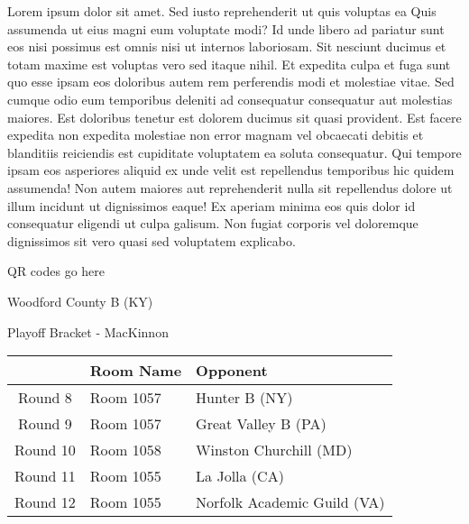 \documentclass{article}%
\begin{document}
\vspace*{8pt}%
\linebreak%
\newline%
\newline%
Lorem ipsum dolor sit amet. Sed iusto reprehenderit ut quis voluptas ea Quis assumenda ut eius magni eum voluptate modi? Id unde libero ad pariatur sunt eos nisi possimus est omnis nisi ut internos laboriosam. Sit nesciunt ducimus et totam maxime est voluptas vero sed itaque nihil. Et expedita culpa et fuga sunt quo esse ipsam eos doloribus autem rem perferendis modi et molestiae vitae.\newline%
\newline%
Sed cumque odio eum temporibus deleniti ad consequatur consequatur aut molestias maiores. Est doloribus tenetur est dolorem ducimus sit quasi provident. Est facere expedita non expedita molestiae non error magnam vel obcaecati debitis et blanditiis reiciendis est cupiditate voluptatem ea soluta consequatur. Qui tempore ipsam eos asperiores aliquid ex unde velit est repellendus temporibus hic quidem assumenda!\newline%
\newline%
Non autem maiores aut reprehenderit nulla sit repellendus dolore ut illum incidunt ut dignissimos eaque! Ex aperiam minima eos quis dolor id consequatur eligendi ut culpa galisum. Non fugiat corporis vel doloremque dignissimos sit vero quasi sed voluptatem explicabo.\newline%
\newline%
%
\vspace*{30pt}%
\begin{center}%
\begin{Huge}%
QR codes go here%
\end{Huge}%
\end{center}%
\newpage%
\begin{center}%
\begin{Huge}%
Woodford County B (KY)%
\end{Huge}%
\vspace*{8pt}%
\linebreak%
\begin{Large}%
Playoff Bracket {-} MacKinnon%
\end{Large}%
\end{center}%
%
\begin{tabularx}{\textwidth}{|c|Y|Y|}%
\hline%
&Room Name&Opponent\\%
\hline%
Round 8&Room 1057&Hunter B (NY)\\%
Round 9&Room 1057&Great Valley B (PA)\\%
Round 10&Room 1058&Winston Churchill (MD)\\%
Round 11&Room 1055&La Jolla (CA)\\%
Round 12&Room 1055&Norfolk Academic Guild (VA)\\%
\hline%
\end{tabularx}%
\end{document}
